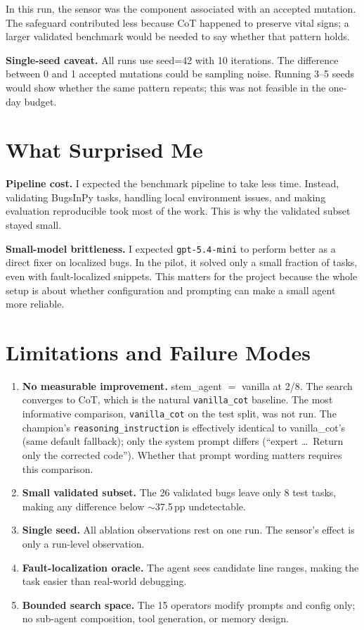 \documentclass[11pt,a4paper]{article}
\begin{document}
In this run, the sensor was the component associated with an accepted mutation.
The safeguard contributed less because CoT happened to preserve vital signs; a
larger validated benchmark would be needed to say whether that pattern holds.

\textbf{Single-seed caveat.} All runs use seed=42 with 10 iterations.
The difference between 0 and 1 accepted mutations could be sampling noise.
Running 3--5 seeds would show whether the same pattern repeats; this was not
feasible in the one-day budget.


\section{What Surprised Me}

\textbf{Pipeline cost.} I expected the benchmark pipeline to take less time.
Instead, validating BugsInPy tasks, handling local environment issues, and making
evaluation reproducible took most of the work. This is why the validated subset
stayed small.

\textbf{Small-model brittleness.} I expected \texttt{gpt-5.4-mini} to perform
better as a direct fixer on localized bugs. In the pilot, it solved only a small
fraction of tasks, even with fault-localized snippets. This matters for the
project because the whole setup is about whether configuration and prompting can
make a small agent more reliable.


\section{Limitations and Failure Modes}

\begin{enumerate}[nosep]
\item \textbf{No measurable improvement.} stem\_agent $=$ vanilla at 2/8.
  The search converges to CoT, which is the natural \texttt{vanilla\_cot}
  baseline. The most informative comparison, \texttt{vanilla\_cot} on the
  test split, was not run. The champion's \texttt{reasoning\_instruction}
  is effectively identical to vanilla\_cot's (same default fallback);
  only the system prompt differs (``expert \ldots\ Return only the corrected
  code''). Whether that prompt wording matters requires this comparison.
\item \textbf{Small validated subset.} The 26 validated bugs leave only 8 test
  tasks, making any difference below $\sim$37.5\,pp undetectable.
\item \textbf{Single seed.} All ablation observations rest on one run. The sensor's
  effect is only a run-level observation.
\item \textbf{Fault-localization oracle.} The agent sees candidate line ranges,
  making the task easier than real-world debugging.
\item \textbf{Bounded search space.} The 15 operators modify prompts and config
  only; no sub-agent composition, tool generation, or memory design.
\end{enumerate}
\end{document}
